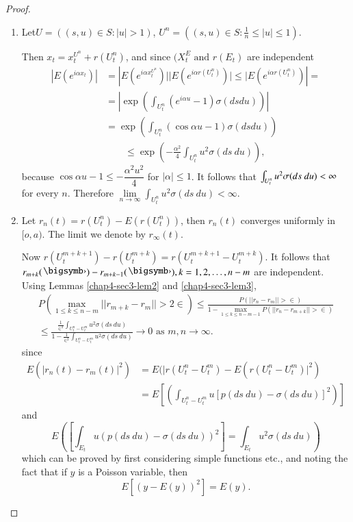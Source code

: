 \begin{proof}
\begin{enumerate}
\item Let\pageoriginale $U= ((s,u)\in S : | u | > 1)$, $U^n = (( s,u)
  \in S : \frac{1}{n} \le | u | \le 1)$. 
        
   Then $x_t = x^{U^n}_t+ r(U^n_t)$, and since $(X^E_t \text{ and }
   r(E_t)$ are independent 
   \begin{align*}
     | E (e^{i \alpha x_t}) | &= \left| E\left(e^{i \alpha x^{U^n}_{t}}\right) |  | E
     \left(e^{i \alpha r (U^n_t)}\right) | \le | E \left(e^{i \alpha r
       (U^n_t)}\right) \right| = \\  
     & = \left|\exp \left( \int_{U^n_t} \left( e^{i \alpha u}-1\right) \sigma (ds
     du)\right)\right|\\   
     & = \exp \left( \int_{U^{n}_t}( \cos \alpha u-1) \sigma (ds
     du)\right)\\ 
     & \qquad \le \exp \left( -
     \frac{\alpha^2}{4} \int_{U^n_t} u^2 \sigma (ds\ du)\right), 
   \end{align*}    
   because $\cos \alpha u-1 \le - \dfrac{\alpha^2 u^2}{4}$ for $| \alpha
   | \le 1$. It follows that $\int_{U^n_t} u^2\break \sigma (ds\ du) < \infty$
   for every $n$. Therefore $\lim\limits_{n \to \infty} \int_{U^n_t} u^2
   \sigma (ds\ du) < \infty$.
 
\item Let $r_n (t) = r(U^n_t) - E(r(U^n_t))$, then $r_n(t)$
   converges uniformly in $[ o,a)$. The limit we denote by $r_\infty
     (t)$. 

Now $r(U^{m+k+1}_t) - r(U^{m+k}_t) =r(U^{m+k+1}_t - U^{m+k}_t)
$. It follows that $r_{m+k}(\bigdot)-r_{m+k-1}(\bigdot), k= 1,2,
\ldots , n-m$ are 
independent. Using Lemmas \ref{chap4-sec3-lem2} and \ref{chap4-sec3-lem3},   
\begin{align*}
  P \left(\max_{1 \le k \le n-m} || r_{m+k} - r_m || > 2 \in \right) \le
  \frac{P( ||  r_n - r_m || >\in)}{1- \max\limits_{1 \le k \le n-m-1}
    P ( || r_n -r_{m+k} || > \in )} \\ 
  \le \frac{\frac{1}{\in^2} \int_{U^n_{t}- U^m_t} u^2 \sigma (ds\
    du)}{1- \frac{1}{\in^2 }\int_{U^n_{t}- U^m_t} u^2 \sigma (ds\ du)}
  \to 0 \text{ as } m,n \to \infty. 
\end{align*}         
since    
\begin{align*}
E( |r_n (t) - r_m (t)|^2) &= E (| r (U^n_t- U^m_t) -
  E(r(U^n_t-  U^m_t) |^2 ) \\ 
  &= E \left[ \left( \int_{U^n_t- U^m_t} u [ p (ds\ du) - \sigma (ds\
      du)]^2\right)\right] 
\end{align*}\pageoriginale 
and 
$$
E \left(\left[ \int_{E_t} u (p(ds\ du) - \sigma (ds\ du))^2\right] =
\int_{E_t} u^2 \sigma (ds\ du)\right) 
$$
which can be proved by first considering simple functions etc., and
noting the fact that if $y$ is a Poisson variable, then 
$$
E[(y-E(y))^2] = E(y).
$$ 


\end{enumerate}
\end{proof}
